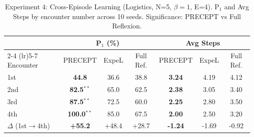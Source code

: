 \begin{table}[t]
\centering
\caption{Experiment 4: Cross-Episode Learning (Logistics, N=5, $\beta=1$, E=4). P$_1$ and Avg Steps by encounter number across 10 seeds. Significance: PRECEPT vs Full Reflexion.}
\label{tab:continuous_learning}
\begin{tabular}{l ccc ccc}
\toprule
& \multicolumn{3}{c}{\textbf{P$_1$ (\%)}} & \multicolumn{3}{c}{\textbf{Avg Steps}} \\
\cmidrule(lr){2-4} \cmidrule(lr){5-7}
Encounter & PRECEPT & ExpeL & Full Ref. & PRECEPT & ExpeL & Full Ref. \\
\midrule
  1st & \textbf{44.8} & 36.6 & 38.8 & \textbf{3.24} & 4.19 & 4.12 \\
  2nd & \textbf{82.5}$^{**}$ & 65.0 & 62.5 & \textbf{2.38} & 3.05 & 3.40 \\
  3rd & \textbf{87.5}$^{**}$ & 72.5 & 60.0 & \textbf{2.25} & 2.80 & 3.50 \\
  4th & \textbf{100.0}$^{**}$ & 85.0 & 67.5 & \textbf{2.00} & 2.50 & 3.20 \\
\midrule
  $\Delta$ (1st$\to$4th) & \textbf{+55.2} & +48.4 & +28.7 & \textbf{-1.24} & -1.69 & -0.92 \\
\bottomrule
\end{tabular}
\end{table}